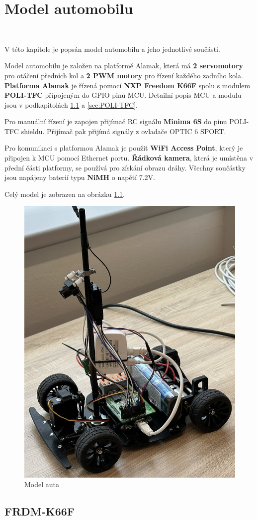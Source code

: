 \chapter{Model automobilu}
\label{sec:CarModel}\
\vspace{-30pt}

V této kapitole je popsán model automobilu a jeho jednotlivé 
součásti.

Model automobilu je založen na platformě Alamak, která má
\textbf{2 servomotory} pro otáčení předních kol a
\textbf{2 PWM motory} pro řízení každého
zadního kola. 
\textbf{Platforma Alamak} je řízená pomocí \textbf{NXP Freedom K66F}\cite{frdmk66UserGuide} spolu
s modulem \textbf{POLI-TFC} přípojeným do GPIO pinů MCU.
Detailní popis MCU a modulu jsou v podkapitolách \ref{sec:FRDM-K66F}
a \ref{sec:POLI-TFC}.

Pro manuální řízení je zapojen přijímač RC signálu \textbf{Minima 6S} do pinu POLI-TFC shieldu. Přijímač pak přijímá signály z
ovladače OPTIC 6 SPORT.

Pro komunikaci s platformou Alamak je použit \textbf{WiFi Access Point}, který je připojen k MCU pomocí Ethernet portu. \textbf{Řádková kamera}, která je umístěna v přední části platformy,
se používá pro získání obrazu dráhy. Všechny součástky jsou
napájeny baterií typu \textbf{NiMH} o napětí 7.2V.

Celý model je zobrazen na obrázku \ref{fig:car}.
\begin{figure}[!h]
    \vspace{-10pt}
    \centering
    \includegraphics[width = .45\linewidth]{Figures/Car.jpeg}
    \caption{Model auta}
    \label{fig:car}
    \vspace{-10pt}
\end{figure}

\section{FRDM-K66F}
\label{sec:FRDM-K66F}\

